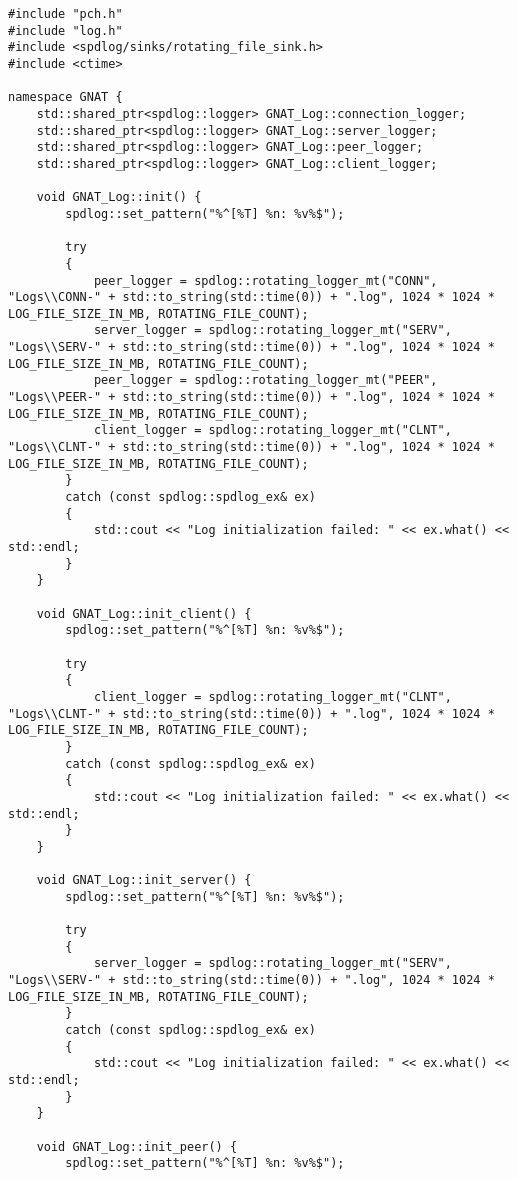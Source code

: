 \begin{lstlisting}
#include "pch.h"
#include "log.h"
#include <spdlog/sinks/rotating_file_sink.h>
#include <ctime>

namespace GNAT {
	std::shared_ptr<spdlog::logger> GNAT_Log::connection_logger;
	std::shared_ptr<spdlog::logger> GNAT_Log::server_logger;
	std::shared_ptr<spdlog::logger> GNAT_Log::peer_logger;
	std::shared_ptr<spdlog::logger> GNAT_Log::client_logger;

	void GNAT_Log::init() {
		spdlog::set_pattern("%^[%T] %n: %v%$");

		try
		{
			peer_logger = spdlog::rotating_logger_mt("CONN", "Logs\\CONN-" + std::to_string(std::time(0)) + ".log", 1024 * 1024 * LOG_FILE_SIZE_IN_MB, ROTATING_FILE_COUNT);
			server_logger = spdlog::rotating_logger_mt("SERV", "Logs\\SERV-" + std::to_string(std::time(0)) + ".log", 1024 * 1024 * LOG_FILE_SIZE_IN_MB, ROTATING_FILE_COUNT);
			peer_logger = spdlog::rotating_logger_mt("PEER", "Logs\\PEER-" + std::to_string(std::time(0)) + ".log", 1024 * 1024 * LOG_FILE_SIZE_IN_MB, ROTATING_FILE_COUNT);
			client_logger = spdlog::rotating_logger_mt("CLNT", "Logs\\CLNT-" + std::to_string(std::time(0)) + ".log", 1024 * 1024 * LOG_FILE_SIZE_IN_MB, ROTATING_FILE_COUNT);
		}
		catch (const spdlog::spdlog_ex& ex)
		{
			std::cout << "Log initialization failed: " << ex.what() << std::endl;
		}
	}

	void GNAT_Log::init_client() {
		spdlog::set_pattern("%^[%T] %n: %v%$");

		try
		{
			client_logger = spdlog::rotating_logger_mt("CLNT", "Logs\\CLNT-" + std::to_string(std::time(0)) + ".log", 1024 * 1024 * LOG_FILE_SIZE_IN_MB, ROTATING_FILE_COUNT);
		}
		catch (const spdlog::spdlog_ex& ex)
		{
			std::cout << "Log initialization failed: " << ex.what() << std::endl;
		}
	}

	void GNAT_Log::init_server() {
		spdlog::set_pattern("%^[%T] %n: %v%$");

		try
		{
			server_logger = spdlog::rotating_logger_mt("SERV", "Logs\\SERV-" + std::to_string(std::time(0)) + ".log", 1024 * 1024 * LOG_FILE_SIZE_IN_MB, ROTATING_FILE_COUNT);
		}
		catch (const spdlog::spdlog_ex& ex)
		{
			std::cout << "Log initialization failed: " << ex.what() << std::endl;
		}
	}

	void GNAT_Log::init_peer() {
		spdlog::set_pattern("%^[%T] %n: %v%$");


\end{lstlisting}

